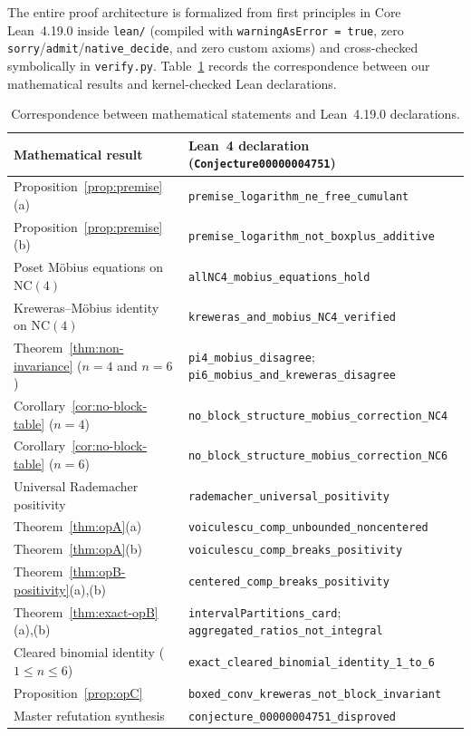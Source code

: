 \documentclass[11pt]{article}
\theoremstyle{definition}
\newcommand{\NC}{\mathrm{NC}}
\begin{document}
The entire proof architecture is formalized from first principles in Core Lean~4.19.0 inside \texttt{lean/} (compiled with \texttt{warningAsError = true}, zero \texttt{sorry}/\texttt{admit}/\texttt{native\_decide}, and zero custom axioms) and cross-checked symbolically in \texttt{verify.py}. Table~\ref{tab:lean-map} records the correspondence between our mathematical results and kernel-checked Lean declarations.

\begin{table}[H]
\centering
\caption{Correspondence between mathematical statements and Lean~4.19.0 declarations.}\label{tab:lean-map}
\small
\begin{tabular}{@{}ll@{}}
\toprule
Mathematical result & Lean~4 declaration (\texttt{Conjecture00000004751}) \\
\midrule
Proposition~\ref{prop:premise}(a) & \texttt{premise\_logarithm\_ne\_free\_cumulant} \\
Proposition~\ref{prop:premise}(b) & \texttt{premise\_logarithm\_not\_boxplus\_additive} \\
Poset M\"obius equations on $\NC(4)$ & \texttt{allNC4\_mobius\_equations\_hold} \\
Kreweras--M\"obius identity on $\NC(4)$ & \texttt{kreweras\_and\_mobius\_NC4\_verified} \\
Theorem~\ref{thm:non-invariance} ($n=4$ and $n=6$) & \texttt{pi4\_mobius\_disagree}; \texttt{pi6\_mobius\_and\_kreweras\_disagree} \\
Corollary~\ref{cor:no-block-table} ($n=4$) & \texttt{no\_block\_structure\_mobius\_correction\_NC4} \\
Corollary~\ref{cor:no-block-table} ($n=6$) & \texttt{no\_block\_structure\_mobius\_correction\_NC6} \\
Universal Rademacher positivity & \texttt{rademacher\_universal\_positivity} \\
Theorem~\ref{thm:opA}(a) & \texttt{voiculescu\_comp\_unbounded\_noncentered} \\
Theorem~\ref{thm:opA}(b) & \texttt{voiculescu\_comp\_breaks\_positivity} \\
Theorem~\ref{thm:opB-positivity}(a),(b) & \texttt{centered\_comp\_breaks\_positivity} \\
Theorem~\ref{thm:exact-opB}(a),(b) & \texttt{intervalPartitions\_card}; \texttt{aggregated\_ratios\_not\_integral} \\
Cleared binomial identity ($1 \le n \le 6$) & \texttt{exact\_cleared\_binomial\_identity\_1\_to\_6} \\
Proposition~\ref{prop:opC} & \texttt{boxed\_conv\_kreweras\_not\_block\_invariant} \\
Master refutation synthesis & \texttt{conjecture\_00000004751\_disproved} \\
\bottomrule
\end{tabular}
\end{table}
\end{document}
